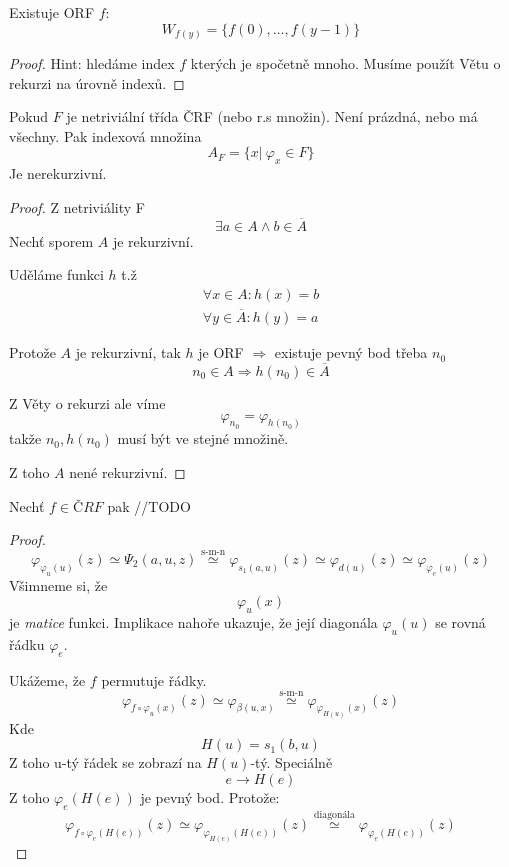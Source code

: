 \begin{theorem}
	Existuje ORF $f$:
	\[ W_{f(y)} = \{ f(0), \ldots, f(y - 1) \} \]
\end{theorem}
\begin{proof}
	Hint: hledáme index $f$ kterých je spočetně mnoho.
	Musíme použít Větu o rekurzi na úrovně indexů.
\end{proof}

\begin{theorem}
	Pokud $F$ je netriviální třída ČRF (nebo r.s množin).
	Není prázdná, nebo má všechny.
	Pak indexová množina
	\[ A_F = \{ x |\ \varphi_x \in F \} \]
	Je nerekurzivní.
\end{theorem}
\begin{proof}
	Z netriviálity F
	\[ \exists a \in A \land b \in \overline{A} \]
	Nechť sporem $A$ je rekurzivní.

	Uděláme funkci $h$ t.ž
	\begin{gather*}
		\forall x \in A: h(x) = b \\
		\forall y \in \overline{A}: h(y) = a
	\end{gather*}

	Protože $A$ je rekurzivní, tak $h$ je ORF $\Rightarrow$ existuje pevný bod třeba $n_0$
	\[ n_0 \in A \Rightarrow h(n_0) \in \overline{A} \]

	Z Věty o rekurzi ale víme
	\[ \varphi_{n_0} = \varphi_{h(n_0)} \]
	takže $n_0, h(n_0)$ musí být ve stejné množině.

	Z toho $A$ nené rekurzivní.
\end{proof}

\begin{theorem}[O rekurzi (BD)]
	Nechť $f \in ČRF$ pak
	//TODO
\end{theorem}
\begin{proof}
	\[ \varphi_{\varphi_u(u)} (z) \simeq \Psi_2(a, u, z) \stackrel{\text{s-m-n}}{\simeq} \varphi_{s_1(a, u)} (z) \simeq \varphi_{d(u)} (z) \simeq \varphi_{\varphi_e(u)} (z) \]
	Všimneme si, že
	\[ \varphi_u(x) \]
	je \emph{matice} funkci. Implikace nahoře ukazuje, že její diagonála $\varphi_u(u)$ se rovná řádku $\varphi_e$.

	Ukážeme, že $f$ permutuje řádky.
	\[ \varphi_{f \circ \varphi_u (x)} (z) \simeq \varphi_{\beta(u, x)} \stackrel{\text{s-m-n}}{\simeq} \varphi_{\varphi_{H(u)}(x)} (z) \]
	Kde
	\[ H(u) = s_1(b, u) \]
	Z toho u-tý řádek se zobrazí na $H(u)$-tý.
	Speciálně
	\[ e \to H(e) \]
	Z toho $\varphi_e(H(e))$ je pevný bod. Protože:
	\[ \varphi_{f \circ \varphi_e(H(e))} (z) \simeq \varphi_{\varphi_{H(e)}(H(e))} (z) \stackrel{\text{diagonála}}{\simeq} \varphi_{\varphi_e(H(e))} (z) \]
\end{proof}
